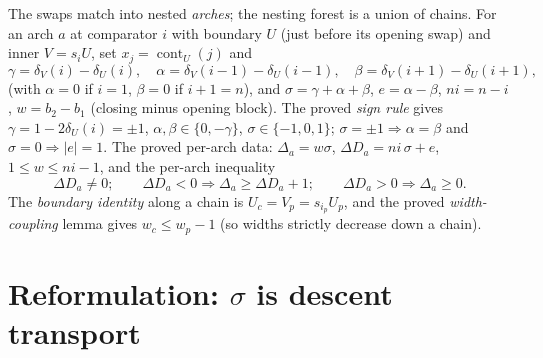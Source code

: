 \documentclass[11pt]{article}
\theoremstyle{plain}
\theoremstyle{definition}
\theoremstyle{remark}
\newcommand{\cont}{\operatorname{cont}}
\newcommand{\dD}{\Delta D}
\begin{document}
The swaps match into nested \emph{arches}; the nesting forest is a union of chains. For an
arch $a$ at comparator $i$ with boundary $U$ (just before its opening swap) and inner
$V=s_iU$, set $x_j=\cont_U(j)$ and
\[
\gamma=\delta_V(i)-\delta_U(i),\quad
\alpha=\delta_V(i{-}1)-\delta_U(i{-}1),\quad
\beta=\delta_V(i{+}1)-\delta_U(i{+}1),
\]
(with $\alpha=0$ if $i=1$, $\beta=0$ if $i{+}1=n$), and $\sigma=\gamma+\alpha+\beta$,
$e=\alpha-\beta$, $ni=n-i$, $w=b_2-b_1$ (closing minus opening block). The proved
\emph{sign rule} gives $\gamma=1-2\delta_U(i)=\pm1$, $\alpha,\beta\in\{0,-\gamma\}$,
$\sigma\in\{-1,0,1\}$; $\sigma=\pm1\Rightarrow\alpha=\beta$ and $\sigma=0\Rightarrow
|e|=1$. The proved per-arch data: $\Delta_a=w\sigma$, $\dD_a=ni\,\sigma+e$,
$1\le w\le ni-1$, and the per-arch inequality
\begin{equation}\label{eq:perarch}
\dD_a\ne0;\qquad \dD_a<0\Rightarrow\Delta_a\ge \dD_a+1;\qquad \dD_a>0\Rightarrow\Delta_a\ge0.
\end{equation}
The \emph{boundary identity} along a chain is $U_{c}=V_{p}=s_{i_p}U_p$, and the proved
\emph{width-coupling} lemma gives $w_{c}\le w_{p}-1$ (so widths strictly decrease down a
chain).

\section{Reformulation: $\sigma$ is descent transport}
\end{document}
